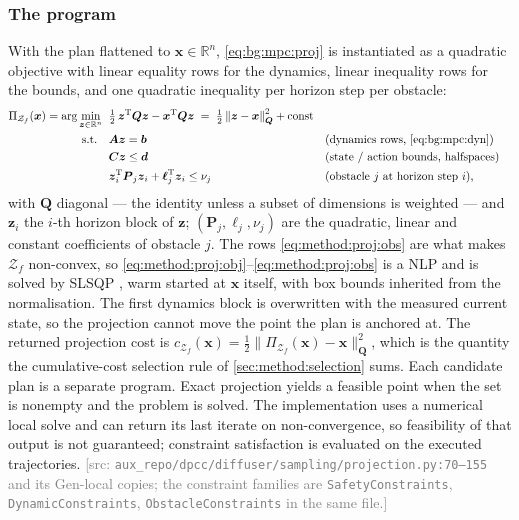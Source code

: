 \documentclass[headsepline,footsepline,footinclude=false,oneside,fontsize=11pt,paper=a4,listof=totoc,bibliography=totoc]{scrbook}
\theoremstyle{definition}
\theoremstyle{plain}
\theoremstyle{remark}
\newcommand{\vect}[1]{\boldsymbol{#1}}
\newcommand{\matr}[1]{\boldsymbol{#1}}
\newcommand{\trans}{^{\textrm{T}}}
\newcommand{\R}{\mathbb{R}}                    %
\newcommand{\proj}[1]{\Pi_{#1}}                %
\newif\ifsubmission
\newcommand{\srcnote}[1]{\ifsubmission\else\textcolor{gray}{\footnotesize\textsf{[src: #1]}}\fi}
\begin{document}
\subsubsection*{The program}

With the plan flattened to $\vect{x}\in\R^{n}$, \eqref{eq:bg:mpc:proj} is instantiated as a
quadratic objective with linear equality rows for the dynamics, linear inequality rows for the
bounds, and one quadratic inequality per horizon step per obstacle:
\begin{align}
  \proj{\mathcal{Z}_{f}}(\vect{x})
    = \arg\min_{\vect{z}\in\R^{n}}\;\; &
       \tfrac{1}{2}\,\vect{z}\trans\matr{Q}\vect{z} - \vect{x}\trans\matr{Q}\vect{z}
       \;=\; \tfrac{1}{2}\left\|\vect{z}-\vect{x}\right\|_{\matr{Q}}^{2} + \text{const}
       \label{eq:method:proj:obj}\\
  \text{s.t.}\quad &
       \matr{A}\vect{z} = \vect{b}
       &&\text{(dynamics rows, \eqref{eq:bg:mpc:dyn})}
       \label{eq:method:proj:eq}\\
    & \matr{C}\vect{z} \le \vect{d}
       &&\text{(state / action bounds, halfspaces)}
       \label{eq:method:proj:ineq}\\
    & \vect{z}_{i}\trans\matr{P}_{j}\vect{z}_{i} + \vect{\ell}_{j}\trans\vect{z}_{i}
       \le \nu_{j}
       &&\text{(obstacle $j$ at horizon step $i$),}
       \label{eq:method:proj:obs}
\end{align}
with $\matr{Q}$ diagonal --- the identity unless a subset of dimensions is weighted --- and
$\vect{z}_{i}$ the $i$-th horizon block of $\vect{z}$; $(\matr{P}_{j},\vect{\ell}_{j},\nu_{j})$
are the quadratic, linear and constant coefficients of obstacle $j$. The rows \eqref{eq:method:proj:obs} are
what makes $\mathcal{Z}_{f}$ non-convex, so \eqref{eq:method:proj:obj}--\eqref{eq:method:proj:obs}
is a \ac{NLP} and is solved by SLSQP \parencite{kraft1988software,virtanen2020scipy}, warm
started at $\vect{x}$ itself, with box bounds inherited from the normalisation. The first
dynamics block is overwritten with the measured current state, so the projection cannot move the
point the plan is anchored at. The returned projection cost is
$c_{\mathcal{Z}_{f}}(\vect{x}) = \tfrac{1}{2}\|\proj{\mathcal{Z}_{f}}(\vect{x})-\vect{x}\|_{\matr{Q}}^{2}$,
which is the quantity the cumulative-cost selection rule of \autoref{sec:method:selection} sums.
Each candidate plan is a separate program. Exact projection yields a feasible point when the set
is nonempty and the problem is solved. The implementation uses a numerical local solve and can
return its last iterate on non-convergence, so feasibility of that output is not guaranteed;
constraint satisfaction is evaluated on the executed trajectories.
\srcnote{\texttt{aux\_repo/dpcc/diffuser/sampling/projection.py:70--155} and its Gen-local copies;
the constraint families are \texttt{SafetyConstraints}, \texttt{DynamicConstraints},
\texttt{ObstacleConstraints} in the same file.}
\end{document}
